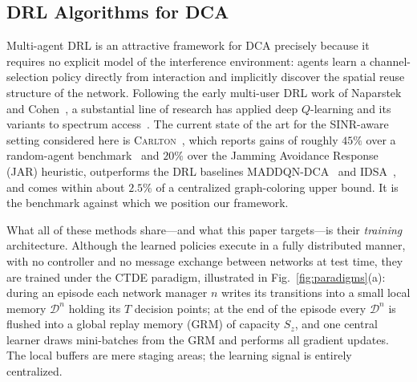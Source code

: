 \documentclass[journal]{IEEEtran}
\newcommand{\CARLTON}{\textsc{Carlton}}
\begin{document}
\subsection{DRL Algorithms for DCA}
\label{subsec:intro_related}

Multi-agent DRL is an attractive framework for DCA precisely because it
requires no explicit model of the interference environment: agents learn a
channel-selection policy directly from interaction and implicitly discover the
spatial reuse structure of the network. Following the early multi-user DRL work
of Naparstek and Cohen~\cite{naparstek2019deep}, a substantial line of research
has applied deep $Q$-learning and its variants to spectrum
access~\cite{adeogun2023distributed,kaur2023deep,du2022multi}. The current
state of the art for the SINR-aware setting considered here is
\CARLTON{}~\cite{cohen2024carlton}, which reports gains of roughly $45\%$ over
a random-agent benchmark~\cite{cohen2017distributed} and $20\%$ over the
Jamming Avoidance Response (JAR) heuristic, outperforms the DRL baselines
MADDQN-DCA~\cite{adeogun2023distributed} and IDSA~\cite{kaur2023deep}, and
comes within about $2.5\%$ of a centralized graph-coloring upper bound. It is
the benchmark against which we position our framework.

What all of these methods share---and what this paper targets---is their
\emph{training} architecture. Although the learned policies execute in a fully
distributed manner, with no controller and no message exchange between networks
at test time, they are trained under the CTDE paradigm, illustrated in
Fig.~\ref{fig:paradigms}(a): during an episode each network manager $n$ writes
its transitions into a small local memory $\mathcal{D}^{n}$ holding its $T$
decision points; at the end of the episode every $\mathcal{D}^{n}$ is flushed
into a global replay memory (GRM) of capacity $S_{z}$, and one central learner
draws mini-batches from the GRM and performs all gradient updates. The local
buffers are mere staging areas; the learning signal is entirely centralized.
\end{document}
